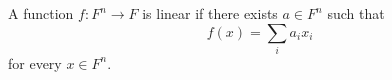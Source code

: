\begin{definition}
\label{def:ff-linear}
\leanok
A function $f : F^n \to F$ is linear if there exists
  $a \in F^n$ such that
  \[
    f(x) = \sum_i a_i x_i
  \]
  for every $x \in F^n$.
\end{definition}
